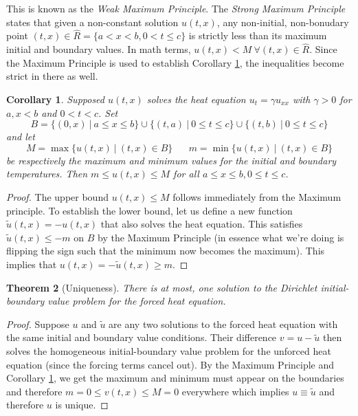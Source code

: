 \documentclass{article}
\newtheorem{theorem}{Theorem}[section]
\newtheorem{corollary}[theorem]{Corollary}
\theoremstyle{definition}
\begin{document}
This is known as the \textit{Weak Maximum Principle}. The \textit{Strong Maximum Principle} states that given a non-constant solution $u(t,x)$, any non-initial, non-bonudary point $(t,x) \in \hat{R} = \{a<x<b, 0<t\leq c\}$ is strictly less than its maximum initial and boundary values. In math terms, $u(t,x)<M \ \forall(t,x)\in \hat{R}$. Since the Maximum Principle is used to establish Corollary \ref{coro:mM}, the inequalities become strict in there as well. 
\begin{corollary}
    Supposed $u(t,x)$ solves the heat equation $u_t = \gamma u_{xx}$ with $\gamma > 0$ for $a,x<b$ and $0<t<c$. Set 
    \begin{equation*}
        B=\{(0,x) \ | \ a\leq x \leq b\} \cup \{(t,a)\ | \ 0\leq t \leq c\} \cup \{(t,b)\ | \ 0 \leq t \leq c\}
    \end{equation*}
    and let 
    \begin{equation*}
        M = \max \{u(t,x) \ | \ (t,x) \in B\} \hspace{20pt} m=\min \{u(t,x) \ | \ (t,x) \in B \}
    \end{equation*}
    be respectively the maximum and minimum values for the initial and boundary temperatures. Then $m \leq u(t,x) \leq M$ for all $a \leq x \leq b, 0 \leq t \leq c$.\label{coro:mM}
\end{corollary}
\begin{proof}
        The upper bound $u(t,x) \leq M$ follows immediately from the Maximum principle. To establish the lower bound, let us define a new function $\tilde{u}(t,x) = -u(t,x)$ that also solves the heat equation. This satisfies $\tilde{u}(t,x) \leq -m$ on $B$ by the Maximum Principle (in essence what we're doing is flipping the sign such that the minimum now becomes the maximum). This implies that $u(t,x) = -\tilde{u}(t,x) \geq m$.
    \end{proof}
\begin{theorem}[Uniqueness]
    There is at most, one solution to the Dirichlet initial-boundary value problem for the forced heat equation.
\end{theorem}
\begin{proof}
    Suppose $u$ and $\tilde{u}$ are any two solutions to the forced heat equation with the same initial and boundary value conditions. Their difference $v=u-\tilde{u}$ then solves the homogeneous initial-boundary value problem for the unforced heat equation (since the forcing terms cancel out). By the Maximum Principle and Corollary \ref{coro:mM}, we get the maximum and minimum must appear on the boundaries and therefore $m=0\leq v(t,x) \leq M=0$ everywhere which implies $u\equiv \tilde{u}$ and therefore $u$ is unique.
\end{proof}
\end{document}
